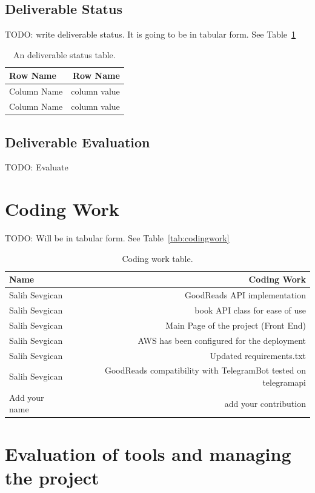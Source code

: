 \documentclass[a4paper]{article}
\begin{document}
\subsection{Deliverable Status}
TODO: write deliverable status. It is going to be in tabular form. See Table~\ref{tab:deliverablestatus}

\begin{table}
\centering
\begin{tabular}{l|r}
Row Name & Row Name \\\hline
Column Name & column value \\
Column Name & column value
\end{tabular}
\caption{\label{tab:deliverablestatus}An deliverable status table.}
\end{table}

\subsection{Deliverable Evaluation}
TODO: Evaluate

\newpage
\section{Coding Work}
TODO: Will be in tabular form. See Table~\autoref{tab:codingwork}

\begin{table}[!hb]
\centering
\begin{tabular}{l|r}
Name & Coding Work \\\hline
Salih Sevgican & GoodReads API implementation \\
Salih Sevgican & book API class for ease of use \\
Salih Sevgican & Main Page of the project (Front End)\\
Salih Sevgican & AWS has been configured for the deployment\\
Salih Sevgican & Updated requirements.txt\\
Salih Sevgican & GoodReads compatibility with TelegramBot tested on telegramapi\\
Add your name & add your contribution
\end{tabular}
\caption{\label{tab:codingwork}Coding work table.}
\end{table}

\section{Evaluation of tools and managing the project}
\end{document}
